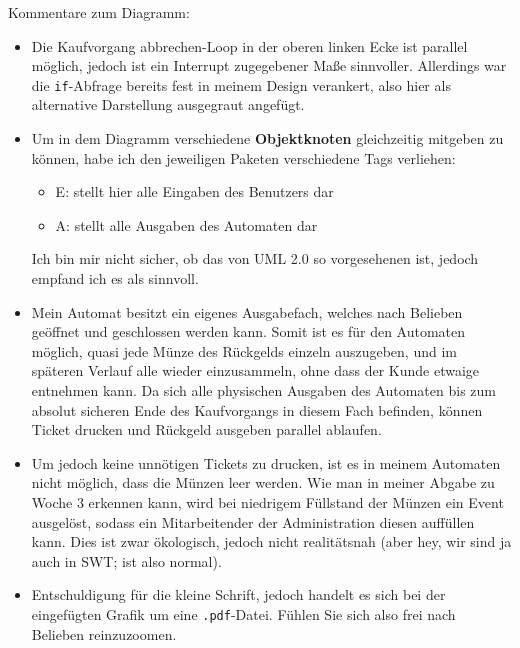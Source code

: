 \documentclass{article}
\newcommand{\gqq}[1]{\glqq{}#1\grqq{}}
\begin{document}
\begin{enumerate}[label=\alph*.]
            Kommentare zum Diagramm:
            \begin{itemize}
                \item Die \gqq{Kaufvorgang abbrechen}-Loop in der oberen linken Ecke ist parallel möglich, jedoch ist ein Interrupt zugegebener Maße sinnvoller.
                    Allerdings war die \texttt{if}-Abfrage bereits fest in meinem Design verankert, also hier als alternative Darstellung ausgegraut angefügt.
                \item Um in dem Diagramm verschiedene \textbf{Objektknoten} gleichzeitig mitgeben zu können, habe ich den jeweiligen Paketen verschiedene Tags verliehen:
                    \begin{itemize}
                        \item E: stellt hier alle Eingaben des Benutzers dar
                        \item A: stellt alle Ausgaben des Automaten dar
                    \end{itemize}
                    Ich bin mir nicht sicher, ob das von UML 2.0 so vorgesehenen ist, jedoch empfand ich es als sinnvoll.
                \item Mein Automat besitzt ein eigenes Ausgabefach, welches nach Belieben geöffnet und geschlossen werden kann.
                    Somit ist es für den Automaten möglich, quasi jede Münze des Rückgelds einzeln auszugeben, und im späteren Verlauf alle wieder einzusammeln, ohne dass der Kunde etwaige entnehmen kann.
                    Da sich alle physischen Ausgaben des Automaten bis zum absolut sicheren Ende des Kaufvorgangs in diesem Fach befinden, können \gqq{Ticket drucken} und \gqq{Rückgeld ausgeben} parallel ablaufen.
                \item Um jedoch keine unnötigen Tickets zu drucken, ist es in meinem Automaten nicht möglich, dass die Münzen leer werden.
                    Wie man in meiner Abgabe zu Woche 3 erkennen kann, wird bei niedrigem Füllstand der Münzen ein Event ausgelöst, sodass ein Mitarbeitender der Administration diesen auffüllen kann.
                    Dies ist zwar ökologisch, jedoch nicht realitätsnah (aber hey, wir sind ja auch in SWT; ist also normal).
                \item Entschuldigung für die kleine Schrift, jedoch handelt es sich bei der eingefügten Grafik um eine \texttt{.pdf}-Datei.
                    Fühlen Sie sich also frei nach Belieben reinzuzoomen.
            \end{itemize}


\end{enumerate}
\end{document}
